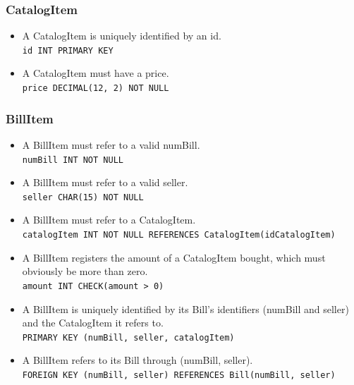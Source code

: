\documentclass{report}[a4paper]
\theoremstyle{remark}
\begin{document}
\subsubsection{CatalogItem}
\begin{itemize}
    \item A CatalogItem is uniquely identified by an id.                                            \\ \texttt{id INT PRIMARY KEY}
    \item A CatalogItem must have a price.                                                          \\ \texttt{price DECIMAL(12, 2) NOT NULL}
\end{itemize}
\subsubsection{BillItem}
\begin{itemize}
    \item A BillItem must refer to a valid numBill.                                                                             \\ \texttt{numBill INT NOT NULL}
    \item A BillItem must refer to a valid seller.                                                                              \\ \texttt{seller CHAR(15) NOT NULL}
    \item A BillItem must refer to a CatalogItem.                                                                               \\ \texttt{catalogItem INT NOT NULL REFERENCES CatalogItem(idCatalogItem)}
    \item A BillItem registers the amount of a CatalogItem bought, which must obviously be more than zero.                      \\ \texttt{amount INT CHECK(amount > 0)}
    \item A BillItem is uniquely identified by its Bill's identifiers (numBill and seller) and the CatalogItem it refers to.    \\ \texttt{PRIMARY KEY (numBill, seller, catalogItem)}
    \item A BillItem refers to its Bill through (numBill, seller).                                                              \\ \texttt{FOREIGN KEY (numBill, seller) REFERENCES Bill(numBill, seller)}
\end{itemize}
\end{document}
